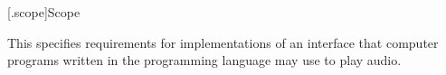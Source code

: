 
[\ioaudio.scope]{Scope}

\pnum
{}%
This \documenttypename{} specifies requirements for implementations of an interface that computer programs written in the \Cpp programming language may use to play audio.
